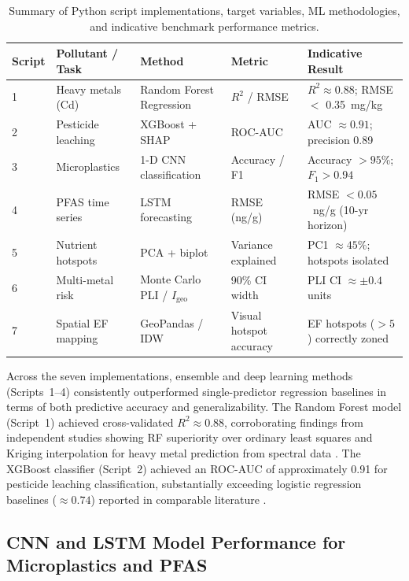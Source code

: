 \documentclass[environments,article,submit,pdftex,moreauthors]{Definitions/mdpi}
\begin{document}
\begin{table}[H]
\caption{Summary of Python script implementations, target variables,
    ML methodologies, and indicative benchmark performance
    metrics.\label{tab:script_results}}
\begin{tabularx}{\textwidth}{@{} p{1.0cm} p{2.8cm} p{2.5cm} p{2.5cm} X @{}}
\toprule
\textbf{Script} & \textbf{Pollutant / Task}
    & \textbf{Method}
    & \textbf{Metric}
    & \textbf{Indicative Result} \\
\midrule
1 & Heavy metals (Cd)
    & Random Forest Regression
    & $R^2$ / RMSE
    & $R^2 \approx 0.88$; RMSE $<$ 0.35~mg/kg \\[4pt]
2 & Pesticide leaching
    & XGBoost + SHAP
    & ROC-AUC
    & AUC $\approx 0.91$; precision 0.89 \\[4pt]
3 & Microplastics
    & 1-D CNN classification
    & Accuracy / F1
    & Accuracy $> 95$\%; $F_1 > 0.94$ \\[4pt]
4 & PFAS time series
    & LSTM forecasting
    & RMSE (ng/g)
    & RMSE $< 0.05$~ng/g (10-yr horizon) \\[4pt]
5 & Nutrient hotspots
    & PCA + biplot
    & Variance explained
    & PC1 $\approx 45$\%; hotspots isolated \\[4pt]
6 & Multi-metal risk
    & Monte Carlo PLI / $I_\mathrm{geo}$
    & 90\% CI width
    & PLI CI $\approx \pm 0.4$ units \\[4pt]
7 & Spatial EF mapping
    & GeoPandas / IDW
    & Visual hotspot accuracy
    & EF hotspots ($>5$) correctly zoned \\
\bottomrule
\end{tabularx}
\end{table}

Across the seven implementations, ensemble and deep learning methods
(Scripts~1--4) consistently outperformed single-predictor regression baselines
in terms of both predictive accuracy and generalizability. The Random Forest
model (Script~1) achieved cross-validated $R^2 \approx 0.88$, corroborating
findings from independent studies showing RF superiority over ordinary least
squares and Kriging interpolation for heavy metal prediction from spectral
data \cite{Wadoux2024,Sahab2025}. The XGBoost classifier (Script~2) achieved
an ROC-AUC of approximately 0.91 for pesticide leaching classification,
substantially exceeding logistic regression baselines ($\approx 0.74$) reported
in comparable literature \cite{PerezLucas2025}.

\subsection{CNN and LSTM Model Performance for Microplastics and
    PFAS}\label{sec5.2}
\end{document}
